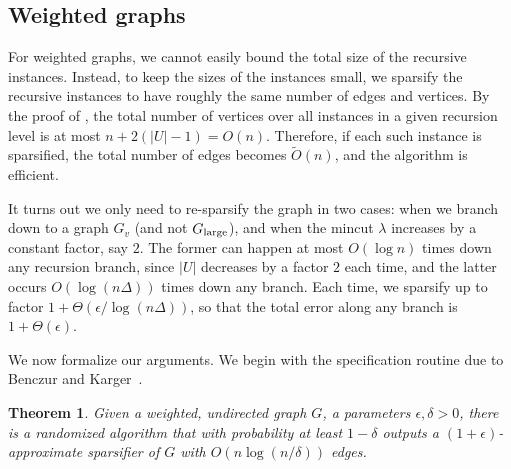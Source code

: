 \documentclass{article}
\newcommand{\f}{\frac}
\newcommand{\BE}{\begin{enumerate}}
\newcommand{\EE}{\end{enumerate}}
\newcommand{\im}{\item}
\newcommand{\logn}{\log n}
\newcommand{\e}{\epsilon}
\newcommand{\de}{\delta}
\newcommand{\De}{\Delta}
\newcommand{\la}{\lambda}
\newcommand{\Th}{\Theta}
\newcommand{\1}{\mathbbm 1}
\newtheorem{theorem}{Theorem}
\newtheorem{definition}[theorem]{Definition}
\newcommand{\BT}{\begin{theorem}}
\newcommand{\ET}{\end{theorem}}
\newcommand{\BD}{\begin{definition}}
\newcommand{\ED}{\end{definition}}
\newcommand{\tO}{\tilde{O}}
\newcommand{\thml}[1]{\label{thm:#1}}
\newcommand{\thm}[1]{\Cref{thm:#1}}
\newcommand{\lem}[1]{\Cref{lem:#1}}
\renewcommand{\emph}[1]{\textbf{\textup{#1}}}
\newcommand{\lar}{{\textup{large}}}
\begin{document}
\subsection{Weighted graphs}


For weighted graphs, we cannot easily bound the total size of the recursive instances. Instead, to keep the sizes of the instances small, we sparsify the recursive instances to have roughly the same number of edges and vertices. By the proof of \lem{runtime}, the total number of vertices over all instances in a given recursion level is at most $n+2(|U|-1)=O(n)$. Therefore, if each such instance is sparsified, the total number of edges becomes $\tO(n)$, and the algorithm is efficient.

It turns out we only need to re-sparsify the graph in two cases: when we branch down to a graph $G_v$ (and not $G_\lar$), and when the mincut $\la$ increases by a constant factor, say $2$. The former can happen at most $O(\logn)$ times down any recursion branch, since $|U|$ decreases by a factor $2$ each time, and the latter occurs $O(\log(n\De))$ times down any branch. Each time, we sparsify up to factor $1+\Th(\e/\log(n\De))$, so that the total error along any branch is $1+\Th(\e)$. 

We now formalize our arguments. We begin with the specification routine due to Benczur and Karger~\cite{BenczurKarger1996}.

\BT\thml{sparsify}
Given a weighted, undirected graph $G$, a parameters $\e,\de>0$, there is a randomized algorithm that with probability at least $1-\de$ outputs a $(1+\e)$-approximate sparsifier of $G$ with $O(n\log(n/\de))$ edges.
\ET
\end{document}
